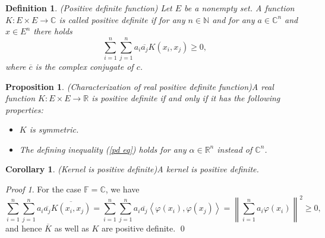 \documentclass[a4paper,12pt]{article}
\newtheorem{prp}[thm]{Proposition}
\newtheorem{cor}[thm]{Corollary}
\newtheorem{dfn}[thm]{Definition}
\theoremstyle{remark}
\newtheorem*{prf}{Proof}
\theoremstyle{definition}
\theoremstyle{definition}
\theoremstyle{definition}
\newcommand{\ip}[2]{\left<#1, #2 \right>}
\newcommand{\norm}[1]{\left\| #1 \right\|}
\begin{document}
\begin{dfn} (Positive definite function)
	Let \( E \) be a nonempty set.
	A function \( K: E \times E \to \mathbb{C} \) is called positive definite if for any \( n \in \mathbb{N} \) and for any \( a \in \mathbb{C}^n \) and \( x \in E^n \) there holds
	\begin{equation}
		\sum_{i=1}^{n} \sum_{j=1}^{n} a_i \overline{a_j}K(x_i,x_j) \ge 0, \label{pd eq}
	\end{equation}
	where \( \overline{c} \) is the complex conjugate of \( c \).
\end{dfn}

\begin{prp} (Characterization of real positive definite function)\label{chara real pd}
	A real function \( K:E \times E \to \mathbb{R} \) is positive definite if and only if it has the following properties:
	\begin{itemize}
		\item[(a)] \( K \) is symmetric.
		\item[(b)] The defining inequality (\ref{pd eq}) holds for any \( \alpha \in \mathbb{R}^n \) instead of \( \mathbb{C}^n \).
	\end{itemize}
\end{prp}

\begin{cor} (Kernel is positive definite)\label{kernel is pd}
	A kernel is positive definite.
\end{cor}
\begin{prf}
	For the case \( \mathbb{F}=\mathbb{C} \), we have
	\begin{equation*}
		\sum_{i=1}^{n} \sum_{j=1}^{n} a_i \overline{a_j} \overline{K(x_i,x_j)}
		= \sum_{i=1}^{n} \sum_{j=1}^{n} a_i \overline{a_j} \ip{\varphi(x_i)}{\varphi(x_j)}
		= \norm{\sum_{i=1}^{n} a_i \varphi(x_i) }^2 \ge 0,
	\end{equation*}
	and hence \( \overline{K} \) as well as \( K \) are positive definite.
	\qed\end{prf}
\end{document}
